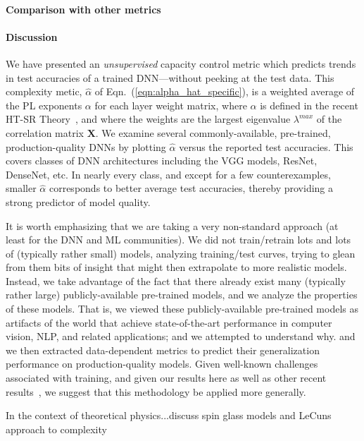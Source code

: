 \paragraph{Comparison with other metrics}

\paragraph{Discussion}

We have presented an \emph{unsupervised} capacity control metric which predicts trends in test accuracies of a trained DNN---without peeking at the test data. 
This complexity metic, $\hat{\alpha}$ of Eqn.~(\ref{eqn:alpha_hat_specific}), is a weighted average of the PL exponents $\alpha$ for each layer weight matrix, where $\alpha$ is defined in the recent HT-SR Theory~\cite{MM18_TR}, and where the weights are the largest eigenvalue $\lambda^{max}$ of the correlation matrix $\mathbf{X}$.  
%
We examine several commonly-available, pre-trained, production-quality DNNs by plotting $\hat{\alpha}$ versus the reported test accuracies.
This covers classes of DNN architectures including the VGG models, ResNet, DenseNet, etc. 
In nearly every class, and except for a few counterexamples, smaller $\hat{\alpha}$ corresponds to better average test accuracies, thereby providing a strong predictor of model quality.

 It is worth emphasizing that 
we are taking a very non-standard approach (at least for the DNN and ML communities).
We did not train/retrain lots and lots of (typically rather small) models, analyzing training/test curves, trying to glean from them bits of insight that might then extrapolate to more realistic models.
Instead, we take advantage of the fact that there already exist many (typically rather large) publicly-available pre-trained models, and we analyze the properties of these models.
That is, we viewed these publicly-available pre-trained models as artifacts of the world that achieve state-of-the-art performance in computer vision, NLP, and related applications; and we attempted to understand why.
and we then extracted data-dependent metrics to predict their generalization performance on production-quality models.
Given well-known challenges associated with training, and given our results here as well as other recent results~\cite{MM18_TR},
we suggest that this methodology be applied more generally.

In the context of theoretical physics...discuss spin glass models and LeCuns approach to complexity


